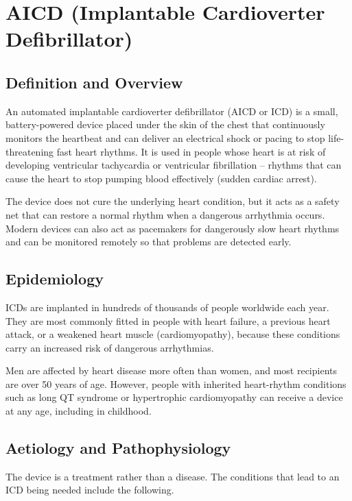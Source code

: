 \chapter{AICD (Implantable Cardioverter Defibrillator)}

\section*{Definition and Overview}
An automated implantable cardioverter defibrillator (AICD or ICD) is a small, battery-powered device placed under the skin of the chest that continuously monitors the heartbeat and can deliver an electrical shock or pacing to stop life-threatening fast heart rhythms. It is used in people whose heart is at risk of developing ventricular tachycardia or ventricular fibrillation -- rhythms that can cause the heart to stop pumping blood effectively (sudden cardiac arrest).

The device does not cure the underlying heart condition, but it acts as a safety net that can restore a normal rhythm when a dangerous arrhythmia occurs. Modern devices can also act as pacemakers for dangerously slow heart rhythms and can be monitored remotely so that problems are detected early.

\section*{Epidemiology}
ICDs are implanted in hundreds of thousands of people worldwide each year. They are most commonly fitted in people with heart failure, a previous heart attack, or a weakened heart muscle (cardiomyopathy), because these conditions carry an increased risk of dangerous arrhythmias.

Men are affected by heart disease more often than women, and most recipients are over 50 years of age. However, people with inherited heart-rhythm conditions such as long QT syndrome or hypertrophic cardiomyopathy can receive a device at any age, including in childhood.

\section*{Aetiology and Pathophysiology}
The device is a treatment rather than a disease. The conditions that lead to an ICD being needed include the following.

